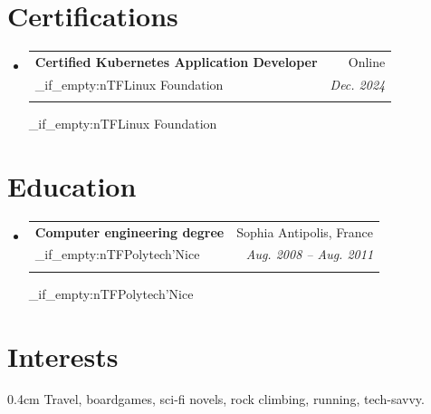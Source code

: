 \documentclass[a4paper,11pt]{article}
\makeatletter
\newcommand{\resumeSubheading}[4]{
  \vspace{-2pt}\item
    \begin{tabular*}{0.97\textwidth}[t]{l@{\extracolsep{\fill}}r}
      \textbf{#1} & #2 \\
      \tl_if_empty:nTF{#3}
        {}
        {\textit{\small#3} & \textit{\small #4} \\}
    \end{tabular*}\vspace{-7pt}
    \tl_if_empty:nTF{#3}{\par\vspace{5pt}}{}
}
\newcommand{\resumeSubHeadingListStart}{\begin{itemize}[leftmargin=0.15in, label={}]}
\newcommand{\resumeSubHeadingListEnd}{\end{itemize}}
\makeatother
\begin{document}
\section{Certifications}
  \resumeSubHeadingListStart
    \resumeSubheading
      {Certified Kubernetes Application Developer}{Online}
      {Linux Foundation}{Dec. 2024}
  \resumeSubHeadingListEnd


\section{Education}
  \resumeSubHeadingListStart
    \resumeSubheading
      {Computer engineering degree}{Sophia Antipolis, France}
      {Polytech'Nice}{Aug. 2008 -- Aug. 2011}
  \resumeSubHeadingListEnd


\section{Interests}
\begin{adjustwidth}{0.4cm}{}
Travel, boardgames, sci-fi novels, rock climbing, running, tech-savvy.
\end{adjustwidth}

\end{document}

